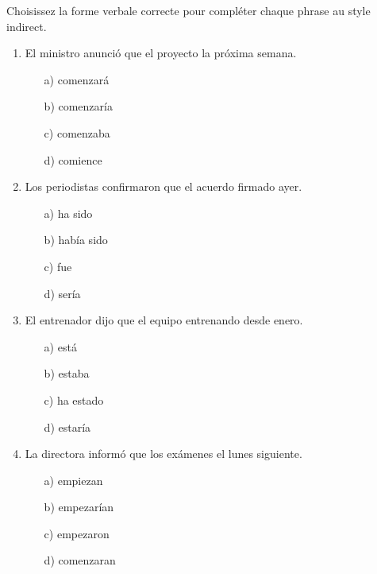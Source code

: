 \documentclass[11pt]{article}
\begin{document}
\begin{exercice}
Choisissez la forme verbale correcte pour compléter chaque phrase au style indirect.
\begin{enumerate}
\item El ministro anunció que el proyecto \underline{\hspace{3cm}} la próxima semana.
      \begin{itemize}
      \item[a)] comenzará
      \item[b)] comenzaría
      \item[c)] comenzaba
      \item[d)] comience
      \end{itemize}
\item Los periodistas confirmaron que el acuerdo \underline{\hspace{3cm}} firmado ayer.
      \begin{itemize}
      \item[a)] ha sido
      \item[b)] había sido
      \item[c)] fue
      \item[d)] sería
      \end{itemize}
\item El entrenador dijo que el equipo \underline{\hspace{3cm}} entrenando desde enero.
      \begin{itemize}
      \item[a)] está
      \item[b)] estaba
      \item[c)] ha estado
      \item[d)] estaría
      \end{itemize}
\item La directora informó que los exámenes \underline{\hspace{3cm}} el lunes siguiente.
      \begin{itemize}
      \item[a)] empiezan
      \item[b)] empezarían
      \item[c)] empezaron
      \item[d)] comenzaran
      \end{itemize}
\end{enumerate}
\end{exercice}
\end{document}
